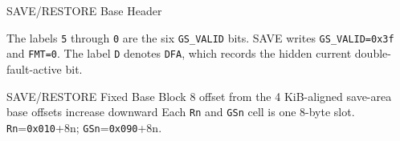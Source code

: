 \begin{manuallistedformatdiagram}{SAVE/RESTORE Base Header}
\end{manuallistedformatdiagram}
{\small The labels \texttt{5} through \texttt{0} are the six \texttt{GS\_VALID} bits. SAVE writes
\texttt{GS\_VALID=0x3f} and \texttt{FMT=0}. The label \texttt{D} denotes \texttt{DFA}, which records the hidden
current double-fault-active bit.\par}
\begin{manuallistedstructlayout}
  {SAVE/RESTORE Fixed Base Block}
  {8}
  {offset from the 4 KiB-aligned save-area base}
  {offsets increase downward}
\manualstructfooter
  {Each \texttt{Rn} and \texttt{GSn} cell is one 8-byte slot.}
  {\texttt{Rn}=\texttt{0x010}+8n; \texttt{GSn}=\texttt{0x090}+8n.}
\end{manuallistedstructlayout}
